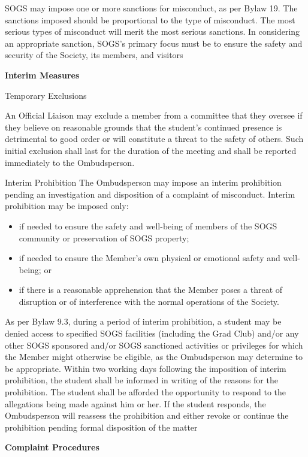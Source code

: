 \begin{longenum}[ label*=\arabic*., align=left]
  SOGS  may  impose  one  or  more  sanctions  for  misconduct,  as  per  Bylaw  19.  The  sanctions imposed should be proportional to the type of misconduct. The most serious types of misconduct will  merit  the  most  serious  sanctions.  In  considering  an  appropriate  sanction,  SOGS's  primary focus must be to ensure the safety and security of the Society, its members, and visitors
  
  
  
  
  
\item \textbf{Interim Measures}

  \begin{longenum}[ label*=\arabic*., align=left]

      \item Temporary Exclusions
                        
              An Official Liaison may exclude a member from a committee that they oversee if they believe on 
reasonable  grounds  that  the  student’s  continued  presence  is  detrimental  to  good  order  or  will constitute a threat to the safety of others. Such initial exclusion shall last for the duration of the meeting and shall be reported immediately to the Ombudsperson.
   \item Interim Prohibition
 The Ombudsperson may impose an interim prohibition pending an investigation and disposition of a complaint of misconduct. Interim prohibition may be imposed only:
 
  \begin{itemize}
     \item  if needed to ensure the safety and well-being of members of the SOGS community or preservation of SOGS property; 
      \item if needed to ensure the Member's own physical or emotional safety and well-being; or 
      \item if there is a reasonable apprehension that the Member poses a threat of disruption or of interference with the normal operations of the Society. 
      \end{itemize}                     
                          
      As per Bylaw 9.3, during a period of interim prohibition, a student may be denied access to specified SOGS facilities (including the Grad Club) and/or any other  SOGS  sponsored and/or  SOGS  sanctioned  activities  or  privileges  for which the Member might otherwise be eligible, as the Ombudsperson may determine to be appropriate. Within two working  days  following  the  imposition  of  interim  prohibition,  the  student  shall  be  informed  in writing of the reasons for the prohibition. The student shall be afforded the opportunity to respond to the allegations being made against him or her. If the student responds, the Ombudsperson will reassess the prohibition and either revoke or continue the prohibition pending formal disposition 
of the matter  
\end{longenum}                      
\item \textbf{Complaint Procedures}


\end{longenum}
